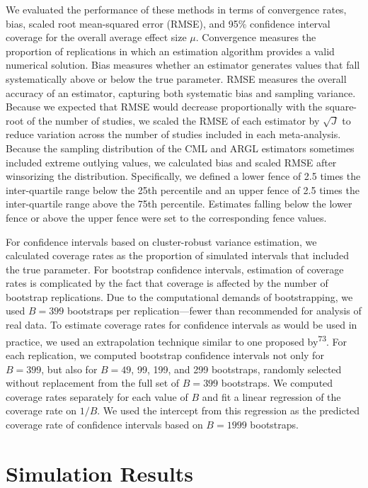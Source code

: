 \documentclass[
  american,
  man, donotrepeattitle,floatsintext]{apa7}
\begin{document}
We evaluated the performance of these methods in terms of convergence rates, bias,
scaled root mean-squared error (RMSE), and 95\% confidence interval coverage for the overall average effect size \(\mu\).
Convergence measures the proportion of replications in which an estimation algorithm provides a valid numerical solution.
Bias measures whether an estimator generates values that fall systematically above or below the true parameter.
RMSE measures the overall accuracy of an estimator, capturing both systematic bias and sampling variance.
Because we expected that RMSE would decrease proportionally with the square-root of the number of studies, we scaled the RMSE of each estimator by \(\sqrt{J}\) to reduce variation across the number of studies included in each meta-analysis.
Because the sampling distribution of the CML and ARGL estimators sometimes included extreme outlying values, we calculated bias and scaled RMSE after winsorizing the distribution.
Specifically, we defined a lower fence of 2.5 times the inter-quartile range below the 25th percentile and an upper fence of 2.5 times the inter-quartile range above the 75th percentile.
Estimates falling below the lower fence or above the upper fence were set to the corresponding fence values.

For confidence intervals based on cluster-robust variance estimation, we calculated coverage rates as the proportion of simulated intervals that included the true parameter.
For bootstrap confidence intervals, estimation of coverage rates is complicated by the fact that coverage is affected by the number of bootstrap replications.
Due to the computational demands of bootstrapping, we used \(B = 399\) bootstraps per replication---fewer than recommended for analysis of real data.
To estimate coverage rates for confidence intervals as would be used in practice, we used an extrapolation technique similar to one proposed by\textsuperscript{73}.
For each replication, we computed bootstrap confidence intervals not only for \(B = 399\), but also for \(B = 49\), 99, 199, and 299 bootstraps, randomly selected without replacement from the full set of \(B = 399\) bootstraps.
We computed coverage rates separately for each value of \(B\) and fit a linear regression of the coverage rate on \(1 / B\).
We used the intercept from this regression as the predicted coverage rate of confidence intervals based on \(B = 1999\) bootstraps.

\section{Simulation Results}\label{simulation-results}
\end{document}
